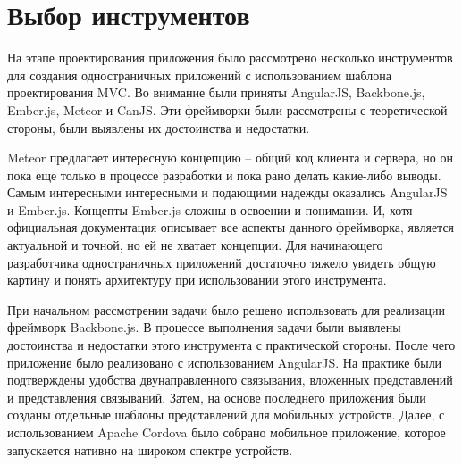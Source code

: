 \section{Выбор инструментов}
На этапе проектирования приложения было рассмотрено несколько инструментов для создания одностраничных приложений с использованием шаблона проектирования MVC. Во внимание были приняты AngularJS, Backbone.js, Ember.js, Meteor и CanJS. Эти фреймворки были рассмотрены с теоретической стороны, были выявлены их достоинства и недостатки.

Meteor предлагает интересную концепцию -- общий код клиента и сервера, но он пока еще только в процессе разработки и пока рано делать какие-либо выводы. Самым интересными интересными и подающими надежды оказались AngularJS и Ember.js. Концепты Ember.js сложны в освоении и понимании. И, хотя официальная документация описывает все аспекты данного фреймворка, является актуальной и точной, но ей не хватает концепции. Для начинающего разработчика одностраничных приложений достаточно тяжело увидеть общую картину и понять архитектуру при использовании этого инструмента.

При начальном рассмотрении задачи было решено использовать для реализации фреймворк Backbone.js. В процессе выполнения задачи были выявлены достоинства и недостатки этого инструмента с практической стороны. После чего приложение было реализовано с использованием AngularJS. На практике были подтверждены удобства двунаправленного связывания, вложенных представлений и представления связываний. Затем, на основе последнего приложения были созданы отдельные шаблоны представлений для мобильных устройств. Далее, с использованием Apache Cordova было собрано мобильное приложение, которое запускается нативно на широком спектре устройств.